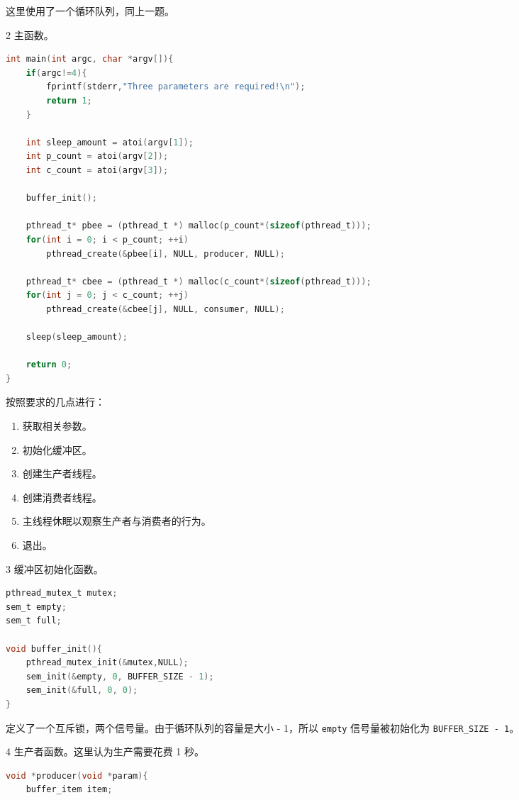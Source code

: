 \documentclass[12pt,a4paper]{article}
\newenvironment{problems}{\begin{list}{}{\renewcommand{\makelabel}[1]{\textbf{##1}\hfil}}}{\end{list}}
\newenvironment{steps}{\begin{list}{}{\renewcommand{\makelabel}[1]{##1.\hfil}}}{\end{list}}
\begin{document}
\begin{problems}
\begin{steps}
        这里使用了一个循环队列，同上一题。

        \item[2] 主函数。
        
        \begin{lstlisting}[language=c]
int main(int argc, char *argv[]){
    if(argc!=4){
        fprintf(stderr,"Three parameters are required!\n");
        return 1;
    }

    int sleep_amount = atoi(argv[1]);
    int p_count = atoi(argv[2]);
    int c_count = atoi(argv[3]);

    buffer_init();

    pthread_t* pbee = (pthread_t *) malloc(p_count*(sizeof(pthread_t)));
    for(int i = 0; i < p_count; ++i)
        pthread_create(&pbee[i], NULL, producer, NULL);
    
    pthread_t* cbee = (pthread_t *) malloc(c_count*(sizeof(pthread_t)));
    for(int j = 0; j < c_count; ++j)
        pthread_create(&cbee[j], NULL, consumer, NULL);
    
    sleep(sleep_amount);

    return 0;
}
        \end{lstlisting}

        按照要求的几点进行：
        \begin{enumerate}
            \item 获取相关参数。
            \item 初始化缓冲区。
            \item 创建生产者线程。
            \item 创建消费者线程。
            \item 主线程休眠以观察生产者与消费者的行为。
            \item 退出。
        \end{enumerate}

        \item[3] 缓冲区初始化函数。
        
        \begin{lstlisting}[language=c]
pthread_mutex_t mutex;
sem_t empty;
sem_t full;

void buffer_init(){
    pthread_mutex_init(&mutex,NULL);
    sem_init(&empty, 0, BUFFER_SIZE - 1);
    sem_init(&full, 0, 0);
}
        \end{lstlisting}

        定义了一个互斥锁，两个信号量。由于循环队列的容量是大小 - 1，所以 \verb"empty" 信号量被初始化为 \verb"BUFFER_SIZE - 1"。
        \item[4] 生产者函数。这里认为生产需要花费 1 秒。
        \begin{lstlisting}[language=c]
void *producer(void *param){
    buffer_item item;


\end{lstlisting}
\end{steps}
\end{problems}
\end{document}
